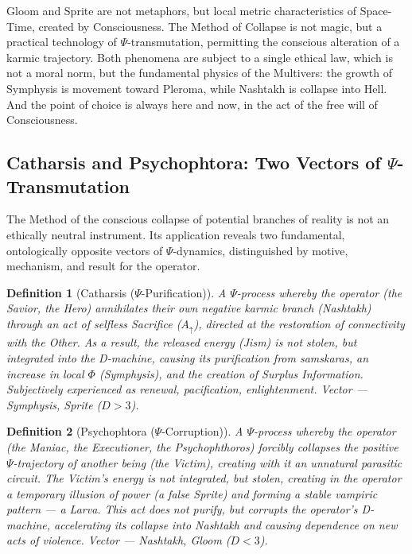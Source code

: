 \documentclass[a4paper,12pt]{article}
\newtheorem{definition}{Definition}
\begin{document}
	Gloom and Sprite are not metaphors, but local metric characteristics of Space-Time, created by Consciousness. The Method of Collapse is not magic, but a practical technology of $\Psi$-transmutation, permitting the conscious alteration of a karmic trajectory. Both phenomena are subject to a single ethical law, which is not a moral norm, but the fundamental physics of the Multivers: the growth of Symphysis is movement toward Pleroma, while Nashtakh is collapse into Hell. And the point of choice is always here and now, in the act of the free will of Consciousness.
	
	\subsection{Catharsis and Psychophtora: Two Vectors of $\Psi$-Transmutation}
	
	The Method of the conscious collapse of potential branches of reality is not an ethically neutral instrument. Its application reveals two fundamental, ontologically opposite vectors of $\Psi$-dynamics, distinguished by motive, mechanism, and result for the operator.
	
	\begin{definition}[Catharsis ($\Psi$-Purification)]
		A $\Psi$-process whereby the operator (the Savior, the Hero) annihilates their own negative karmic branch (Nashtakh) through an act of selfless Sacrifice ($A_{\uparrow}$), directed at the restoration of connectivity with the Other. As a result, the released energy (Jism) is not stolen, but integrated into the D-machine, causing its purification from samskaras, an increase in local $\Phi$ (Symphysis), and the creation of Surplus Information. Subjectively experienced as renewal, pacification, enlightenment. Vector — Symphysis, Sprite ($D > 3$).
	\end{definition}
	
	\begin{definition}[Psychophtora ($\Psi$-Corruption)]
		A $\Psi$-process whereby the operator (the Maniac, the Executioner, the Psychophthoros) forcibly collapses the positive $\Psi$-trajectory of another being (the Victim), creating with it an unnatural parasitic circuit. The Victim's energy is not integrated, but stolen, creating in the operator a temporary illusion of power (a false Sprite) and forming a stable vampiric pattern — a Larva. This act does not purify, but corrupts the operator's D-machine, accelerating its collapse into Nashtakh and causing dependence on new acts of violence. Vector — Nashtakh, Gloom ($D < 3$).
	\end{definition}
	
\end{document}
